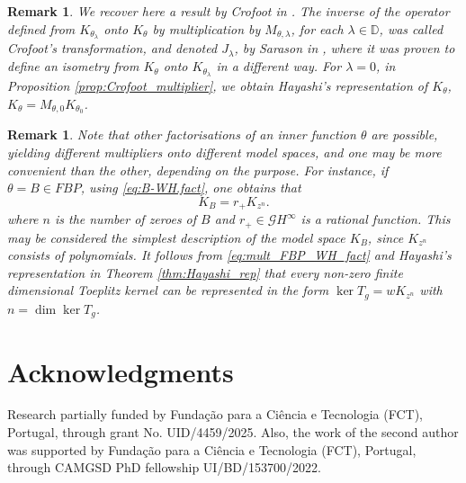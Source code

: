 \documentclass[12pt]{elsarticle}
\numberwithin{equation}{section}
\theoremstyle{plain}
\newtheorem{rem}[thm]{Remark}
\newcommand{\Hinf}{\ensuremath{H^\infty}}
\newcommand{\DD}{\ensuremath{\mathbb{D}}}
\newcommand{\GG}{\ensuremath{\mathcal{G}}}
\begin{document}
\begin{rem}
\label{rem:Crofoot_transform}
We recover here a result by Crofoot in \cite[Theorem 10(a)]{Cro94}.
The inverse of the operator defined from $K_{\theta_\lambda}$ onto $K_\theta$ by multiplication by $M_{\theta,\lambda}$, for each $\lambda\in\DD$, was called Crofoot's transformation, and denoted $J_\lambda$, by Sarason in \cite{Sa07}, where it was proven to define an isometry from $K_\theta$ onto $K_{\theta_\lambda}$ in a different way.
For $\lambda = 0$, in Proposition \ref{prop:Crofoot_multiplier}, we obtain Hayashi's representation of $K_\theta$, $K_\theta = M_{\theta,0} K_{\theta_0}$.
\end{rem}



\begin{rem}
Note that other factorisations of an inner function $\theta$ are possible, yielding different multipliers onto different model spaces, and one may be more convenient than the other, depending on the purpose.
For instance, if $\theta = B \in FBP$, using \eqref{eq:B-WH.fact}, one obtains that
\begin{equation}
\label{eq:mult_FBP_WH_fact}
K_B = r_+ K_{z^n}.
\end{equation}
where $n$ is the number of zeroes of $B$ and $r_+\in\GG\Hinf$ is a rational function.
This may be considered the simplest description of the model space $K_B$, since $K_{z^n}$ consists of polynomials.
It follows from \eqref{eq:mult_FBP_WH_fact} and Hayashi's representation in Theorem \ref{thm:Hayashi_rep} that every non-zero finite dimensional Toeplitz kernel can be represented in the form $\ker T_g = w K_{z^n}$ with $n= \dim \ker T_g$.
\end{rem}



\section*{Acknowledgments}
Research partially funded by Fundação para a Ciência e Tecnologia (FCT), Portugal, through grant No. UID/4459/2025.
Also, the work of the second author was supported by Fundação para a Ciência e Tecnologia (FCT), Portugal, through CAMGSD PhD fellowship UI/BD/153700/2022.








\end{document}

